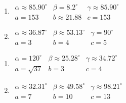 \begin{multicols}{2} 

\begin{enumerate}

\setcounter{enumi}{\value{HW}}

\item $\begin{array}{lll}
\alpha \approx 85.90^{\circ} & \beta = 8.2^{\circ} & \gamma \approx 85.90^{\circ} \\
a = 153 & b \approx 21.88 & c = 153 \end{array}$

\item $\begin{array}{lll}
\alpha \approx 36.87^{\circ} & \beta \approx 53.13^{\circ} & \gamma = 90^{\circ} \\
a = 3 & b = 4 & c = 5 \end{array}$

\setcounter{HW}{\value{enumi}}

\end{enumerate}

\end{multicols}

\begin{multicols}{2} 

\begin{enumerate}

\setcounter{enumi}{\value{HW}}

\item $\begin{array}{lll}
\alpha = 120^{\circ} & \beta \approx 25.28^{\circ} & \gamma \approx 34.72^{\circ} \\
a = \sqrt{37} & b = 3 & c = 4 \end{array}$

\item $\begin{array}{lll}
\alpha \approx 32.31^{\circ} & \beta \approx 49.58^{\circ} & \gamma \approx 98.21^{\circ} \\
a = 7 & b = 10 & c = 13 \end{array}$

\setcounter{HW}{\value{enumi}}

\end{enumerate}

\end{multicols}


